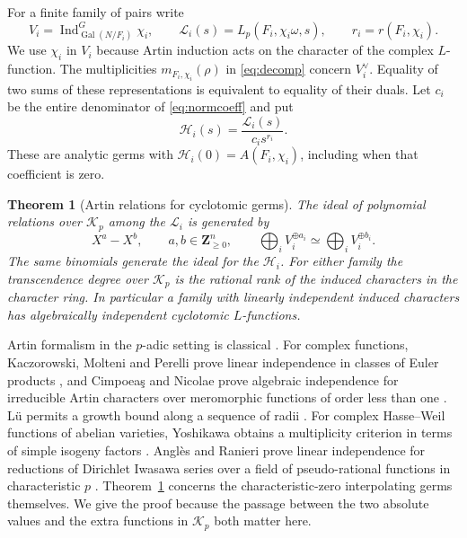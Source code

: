 \documentclass[11pt]{amsart}
\numberwithin{equation}{section}
\newtheorem{theorem}{Theorem}[section]
\theoremstyle{definition}
\theoremstyle{remark}
\newcommand{\Z}{\mathbf Z}
\newcommand{\Gal}{\operatorname{Gal}}
\begin{document}
For a finite family of pairs write
\[
 V_i=\operatorname{Ind}_{\Gal(N/F_i)}^G\chi_i,\qquad
 \mathcal L_i(s)=L_p(F_i,\chi_i\omega,s),\qquad r_i=r(F_i,\chi_i).
\]
We use $\chi_i$ in $V_i$ because Artin induction acts on the character
of the complex $L$-function. The multiplicities $m_{F_i,\chi_i}(\rho)$
in \eqref{eq:decomp} concern $V_i^\vee$. Equality of two sums of
these representations is equivalent to equality of their duals.
Let $c_i$ be the entire denominator of \eqref{eq:normcoeff} and put
\[
 \mathcal H_i(s)=\frac{\mathcal L_i(s)}{c_i s^{r_i}}.
\]
These are analytic germs with $\mathcal H_i(0)=A(F_i,\chi_i)$,
including when that coefficient is zero.

\begin{theorem}[Artin relations for cyclotomic germs]\label{thm:germrelations}
The ideal of polynomial relations over $\mathcal K_p$ among the
$\mathcal L_i$ is generated by
\begin{equation}\label{eq:germbinomials}
 X^a-X^b,\qquad a,b\in\Z_{\ge0}^n,\qquad
 \bigoplus_i V_i^{\oplus a_i}\simeq\bigoplus_i V_i^{\oplus b_i}.
\end{equation}
The same binomials generate the ideal for the $\mathcal H_i$.
For either family the transcendence degree over $\mathcal K_p$ is
the rational rank of the induced characters in the character ring.
In particular a family with linearly independent induced characters
has algebraically independent cyclotomic $L$-functions.
\end{theorem}

Artin formalism in the $p$-adic setting is classical
\cite{GreenbergArtin}. For complex functions, Kaczorowski, Molteni
and Perelli prove linear independence in classes of Euler products
\cite{KMP}, and Cimpoea\c{s} and Nicolae prove algebraic independence
for irreducible Artin characters over meromorphic functions of order
less than one \cite[Cor.~9]{CN}. L\"u permits a growth bound along
a sequence of radii \cite[Cor.~2]{Lu}. For complex Hasse--Weil
functions of abelian varieties, Yoshikawa obtains a multiplicity
criterion in terms of simple isogeny factors \cite[Th.~1.3]{Yoshikawa}.
Angl\`es and Ranieri prove linear independence for
reductions of Dirichlet Iwasawa series over a field of
pseudo-rational functions in characteristic $p$ \cite[Th.~1]{AR}.
Theorem~\ref{thm:germrelations} concerns the characteristic-zero
interpolating germs themselves. We give the proof because the
passage between the two absolute values and the extra functions in
$\mathcal K_p$ both matter here.
\end{document}
